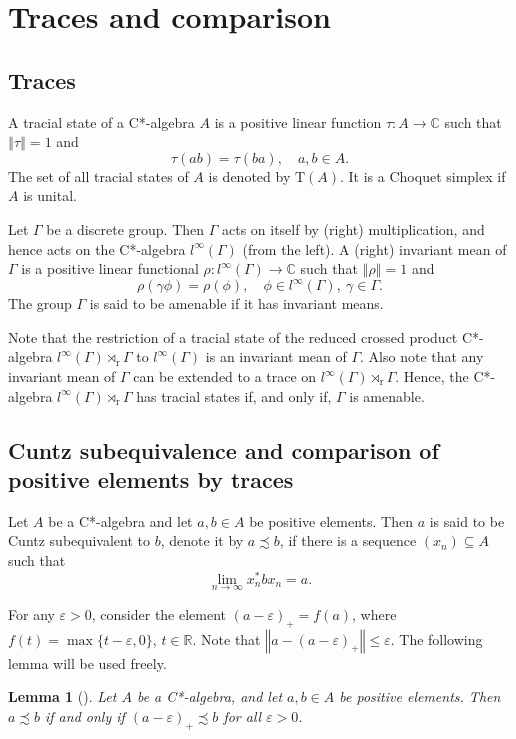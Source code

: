 \documentclass[12pt, oneside, psamsfonts]{amsart}
\newtheorem{lem}[thm]{Lemma}
\theoremstyle{definition}
\theoremstyle{remark}
\numberwithin{equation}{section}
\newcommand{\norm}[1]{\left\Vert#1\right\Vert}
\newcommand{\Real}{\mathbb R}
\newcommand{\Comp}{\mathbb C}
\newcommand{\eps}{\varepsilon}
\newcommand{\tr}{\mathrm{T}}
\begin{document}




\section{Traces and comparison}

\subsection{Traces}
A tracial state of a C*-algebra $A$ is a positive linear function $\tau: A \to \Comp$ such that $\norm{\tau} = 1$ and $$\tau(ab) = \tau(ba), \quad a, b \in A.$$ The set of all tracial states of $A$ is denoted by $\tr(A)$. It is a Choquet simplex if $A$ is unital.

Let $\Gamma$ be a discrete group. Then $\Gamma$ acts on itself by  (right) multiplication, and hence acts on the C*-algebra $l^\infty(\Gamma)$ (from the left). A (right) invariant mean of $\Gamma$ is a positive linear functional $\rho: l^\infty(\Gamma) \to \Comp$ such that $\norm{\rho} = 1$ and $$ \rho(\gamma \phi) = \rho(\phi), \quad \phi \in l^\infty(\Gamma),\ \gamma \in \Gamma.$$ The group $\Gamma$ is said to be amenable if it has invariant means.


Note that the restriction of a tracial state of the reduced crossed product C*-algebra $l^\infty(\Gamma)\rtimes_\mathrm{r}\Gamma$ to $l^\infty(\Gamma)$ is an invariant mean of $\Gamma$. Also note that any invariant mean of $\Gamma$ can be extended to a trace on $l^\infty(\Gamma) \rtimes_\mathrm{r} \Gamma$. Hence, the C*-algebra $l^\infty(\Gamma) \rtimes_\mathrm{r} \Gamma$ has tracial states if, and only if, $\Gamma$ is amenable.




\subsection{Cuntz subequivalence and comparison of positive elements by traces}

Let $A$ be a C*-algebra and let $a, b \in A$ be positive elements. Then $a$ is said to be Cuntz subequivalent to $b$, denote it by $a \precsim b$, if there is a sequence $(x_n) \subseteq A$ such that
$$\lim_{n \to\infty} x_n^* b x_n = a.$$

For any $\eps>0$, consider the element $(a - \eps)_+ = f(a)$, where $f(t) = \max\{t - \eps, 0\}$, $t \in \Real$. Note that $\norm{a - (a-\eps)_+} \leq \eps$. 
The following lemma will be used freely.
\begin{lem}[\cite{RorUHF2}]\label{sub-lem-Cu}
Let $A$ be a C*-algebra, and let $a, b \in A$ be positive elements. Then $a \precsim b$ if and only if $(a -\eps)_+ \precsim b$ for all $\eps>0$. 
\end{lem}
\end{document}
